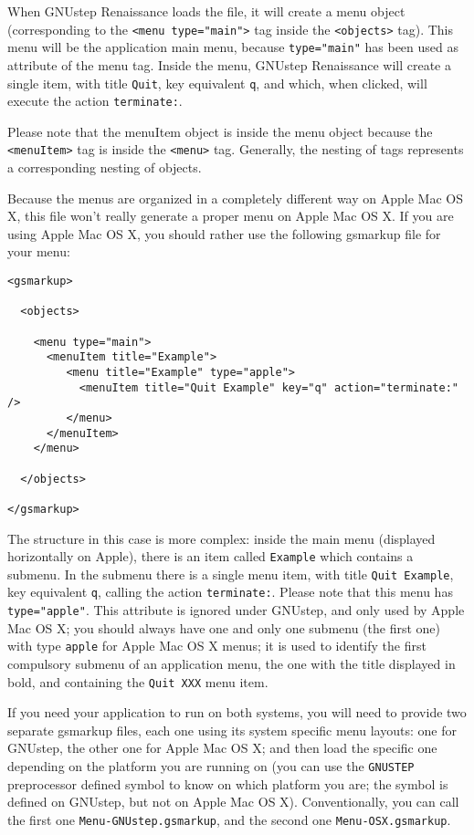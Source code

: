 \documentclass[a4paper]{article}
\begin{document}
When GNUstep Renaissance loads the file, it will create a menu object
(corresponding to the \texttt{<menu type="main">} tag inside the
\texttt{<objects>} tag).  This menu will be the application main menu,
because \texttt{type="main"} has been used as attribute of the menu
tag.  Inside the menu, GNUstep Renaissance will create a single item,
with title \texttt{Quit}, key equivalent \texttt{q}, and which, when
clicked, will execute the action \texttt{terminate:}.

Please note that the menuItem object is inside the menu object because
the \texttt{<menuItem>} tag is inside the \texttt{<menu>} tag.
Generally, the nesting of tags represents a corresponding nesting of
objects.

Because the menus are organized in a completely different way on Apple
Mac OS X, this file won't really generate a proper menu on Apple Mac
OS X.  If you are using Apple Mac OS X, you should rather use the following
gsmarkup file for your menu:
\begin{verbatim}
<gsmarkup>

  <objects>

    <menu type="main">
      <menuItem title="Example">
         <menu title="Example" type="apple">
           <menuItem title="Quit Example" key="q" action="terminate:" />
         </menu>
      </menuItem>
    </menu>
 
  </objects>

</gsmarkup>
\end{verbatim}
The structure in this case is more complex: inside the main menu
(displayed horizontally on Apple), there is an item called
\texttt{Example} which contains a submenu.  In the submenu 
there is a single menu item, with title \texttt{Quit Example}, key
equivalent \texttt{q}, calling the action \texttt{terminate:}.  Please
note that this menu has \texttt{type="apple"}.  This attribute is
ignored under GNUstep, and only used by Apple Mac OS X; you should
always have one and only one submenu (the first one) with type
\texttt{apple} for Apple Mac OS X menus; it is used to identify 
the first compulsory submenu of an application menu, the one with the
title displayed in bold, and containing the \texttt{Quit XXX} menu
item.

If you need your application to run on both systems, you will need to
provide two separate gsmarkup files, each one using its system
specific menu layouts: one for GNUstep, the other one for Apple Mac OS
X; and then load the specific one depending on the platform you are
running on (you can use the \texttt{GNUSTEP} preprocessor defined
symbol to know on which platform you are; the symbol is defined on
GNUstep, but not on Apple Mac OS X).  Conventionally, you can call the
first one \texttt{Menu-GNUstep.gsmarkup}, and the second one
\texttt{Menu-OSX.gsmarkup}.
\end{document}
